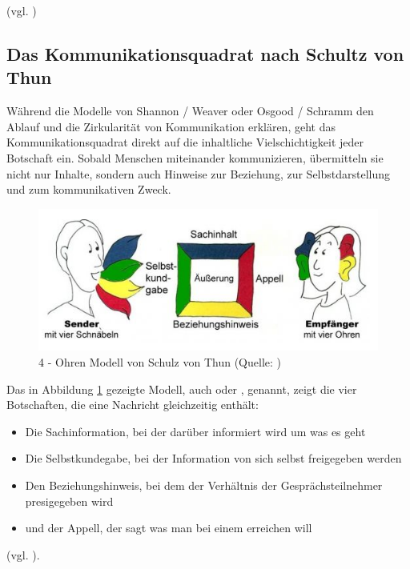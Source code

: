 (vgl. \cite[S. 93]{scheufele_kommunikation_2007})

\subsection{Das Kommunikationsquadrat nach Schultz von Thun}
Während die Modelle von Shannon / Weaver oder Osgood / Schramm den Ablauf und die Zirkularität von Kommunikation erklären, geht das Kommunikationsquadrat direkt auf die inhaltliche Vielschichtigkeit jeder Botschaft ein. Sobald Menschen miteinander kommunizieren, übermitteln sie nicht nur Inhalte, sondern auch Hinweise zur Beziehung, zur Selbstdarstellung und zum kommunikativen Zweck.

\begin{figure}[ht]
\centering
\includegraphics[width=1\linewidth]{content/pictures/Kommunikationsquadrat.PNG}
\caption{4 - Ohren Modell von Schulz von Thun (Quelle: \cite{noauthor_kommunikationsquadrat_nodate})}
\label{fig:four-ears}
\end{figure}

Das in Abbildung \ref{fig:four-ears} gezeigte Modell, auch  oder , genannt, zeigt die vier Botschaften, die eine Nachricht gleichzeitig enthält:

\begin{itemize}
    \item Die Sachinformation, bei der darüber informiert wird um was es geht
    \item Die Selbstkundegabe, bei der Information von sich selbst freigegeben werden
    \item Den Beziehungshinweis, bei dem der Verhältnis der Gesprächsteilnehmer presigegeben wird
    \item und der Appell, der sagt was man bei einem erreichen will
\end{itemize}

(vgl. \cite{noauthor_kommunikationsquadrat_nodate}).

